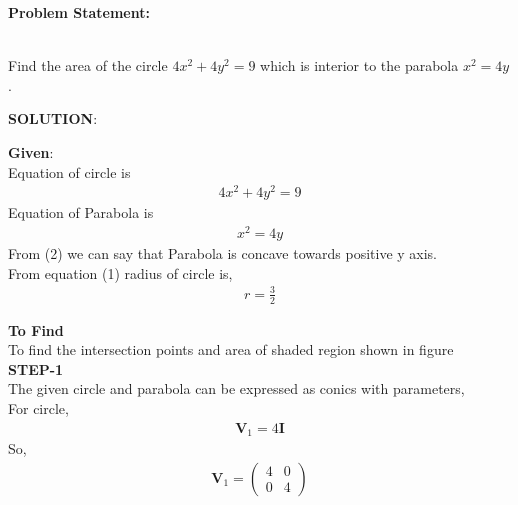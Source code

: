 \documentclass[10pt,a4paper]{report}
\newcommand{\myvec}[1]{\ensuremath{\begin{pmatrix}#1\end{pmatrix}}}
\let\vec\mathbf
\let\vec\mathbf
\begin{document}
\begin{multicols}{2}

\raggedright \textbf{Problem Statement:}\vspace{2mm}
\raggedright \\ Find the area of the circle $4x^2+4y^2=9$ which is interior to the parabola $x^2=4y$.\\
\vspace{5mm}
\raggedright \textbf{SOLUTION}:\vspace{2mm}\\

\raggedright \textbf{Given}:\vspace{2mm}\\
Equation of circle is \\\vspace{1mm}
\begin{align}
4x^2+4y^2=9
\end{align}
Equation of Parabola is \\ \vspace{1mm}
\begin{align}
x^2=4y 
\end{align}
From (2) we can say that Parabola is concave towards positive y axis.\\ \vspace{2mm}
From equation (1) radius of circle is,\\ \vspace{1mm}
\begin{align}
r= \frac{3}{2}
\end{align}

\textbf{To Find }\vspace{2mm}\\
To find the intersection points and area of shaded region shown in figure\vspace{2mm}  \\ 
\textbf{STEP-1}\vspace{2mm}\\
The given circle and parabola can be expressed as conics with parameters,\\ \vspace{1mm}
For circle,\\ \vspace{1mm}
\begin{align}
\vec{V}_1=4\vec{I}
\end{align}
So, \\
\begin{align}
\vec{V}_1=\myvec{
4 & 0\\
0 & 4
}
\end{align} 


\end{multicols}
\end{document}
